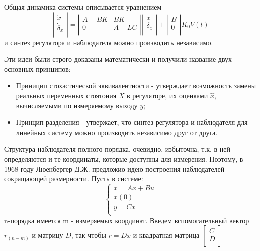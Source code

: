 \documentclass[preprint,russian,a5paper,10pt,twoside,mediummath]{ncc}
\begin{document}
\par Общая динамика системы описывается уравнением \[\left| \begin{matrix}
   {\dot{x}}  \\
   {{{\dot{\delta }}}_{x}}  \\
\end{matrix} \right|=\left| \begin{matrix}
   A-BK & BK  \\
   0 & A-LC  \\
\end{matrix} \right|\left| \begin{matrix}
   x  \\
   {{\delta }_{x}}  \\
\end{matrix} \right|+\left| \begin{matrix}
   B  \\
   0  \\
\end{matrix} \right|{{K}_{0}}V(t)\]
и синтез регулятора и наблюдателя можно производить независимо.
\\
\par Эти идеи были строго доказаны математически и получили название двух основных принципов:
\begin{itemize}
\item Приницип стохастической эквивалентности - утверждает возможность замены реальных переменных стоятония $X$ в регуляторе, их оценками  $\hat{x}$, вычисляемыми по измеряемому выходу $y$; 
\item Принцип разделения - утвержает, что синтез регулятора и наблюдателя для линейных систему можно производить независимо друг от друга. 
\end{itemize}
\par Структура наблюдателя полного порядка, очевидно, избыточна, т.к. в ней определяются и те координаты, которые доступны для измерения. Поэтому, в 1968 году Люенбергер Д.Ж. предложио идею построения наблюдателей сокращающей размерности. Пусть в системе:
 \[\left\{ \begin{array}{*{35}{l}}
   \dot{x}=Ax+Bu  \\
   x(0)  \\
   y=Cx  \\
\end{array} \right.\]
 n-порядка имеется m - измеряемых координат. Введем вспомогательный вектор ${{r}_{(n-m)}}$ и матрицу $D$, так чтобы $r=Dx$ и квадратная матрица $\left[ \begin{matrix}
   C  \\
   D  \\
\end{matrix} \right]$
\end{document}
